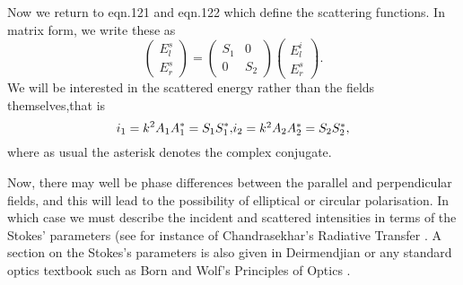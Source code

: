 \documentclass[12pt]{article}
\begin{document}
Now we return to eqn.121 and eqn.122 which define the scattering functions.
In matrix form, we write these as
\begin{equation}
\begin{pmatrix}
 E^s_l \\ E^s_r
\end{pmatrix}= 
\begin{pmatrix}
 S_1 & 0 \\ 0 & S_2 
\end{pmatrix} 
\begin{pmatrix} E^i_l \\ E^s_r
\end{pmatrix}.
\end{equation}
We will be interested in the scattered energy rather than the fields themselves,that is 
\begin{equation}
i_1=k^2 A_1 A^*_1= S_1 S^*_1,
$$   $$
i_2=k^2 A_2 A^*_2= S_2 S^*_2,
\end{equation}
 where as usual the asterisk denotes the complex conjugate.

Now, there may well be phase differences between the parallel and perpendicular fields, and this will lead to the possibility of elliptical or circular polarisation. In which case we must describe the incident and scattered intensities in terms of the Stokes' parameters (see for instance  of Chandrasekhar's Radiative Transfer \cite{Chandrasekhar:Miebib}. A section on the Stokes's parameters is also given in Deirmendjian \cite{Deirmendjian:Miebib} or any standard optics textbook such as Born and Wolf's Principles of Optics \cite{BornWolf:Miebib}.
\end{document}
